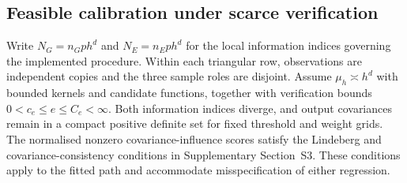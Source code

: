 \subsection{Feasible calibration under scarce verification}
Write $N_G=n_Gph^d$ and $N_E=n_Eph^d$ for the local information indices governing the implemented procedure.
Within each triangular row, observations are independent copies and the three sample roles are disjoint.
Assume $\mu_h\asymp h^d$ with bounded kernels and candidate functions, together with verification bounds $0<c_e\leq e\leq C_e<\infty$.
Both information indices diverge, and output covariances remain in a compact positive definite set for fixed threshold and weight grids.
The normalised nonzero covariance-influence scores satisfy the Lindeberg and covariance-consistency conditions in Supplementary Section~S3.
These conditions apply to the fitted path and accommodate misspecification of either regression.

